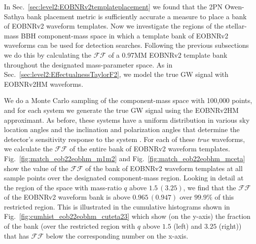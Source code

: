 \documentclass[aps,
prd,
amsmath,
amssymb,
twocolumn,
floatfix,
groupedaddress]{revtex4-1}
\newcommand{\FF}{\mathcal{FF}}
\newcommand{\MM}{\mathrm{MM}}
\begin{document}
In Sec.~\ref{sec:level2:EOBNRv2templateplacement} we found that the 2PN Owen-Sathya bank placement metric is sufficiently accurate a measure to place a bank of EOBNRv2 waveform templates. Now we investigate the regions of the stellar-mass BBH component-mass space in which a template bank of EOBNRv2 waveforms can be used for detection searches. Following the previous subsections we do this by calculating the $\mathcal{FF}$ of a 0.97$\MM$ EOBNRv2 template bank throughout the designated mass-parameter space. As in Sec.~\ref{sec:level2:EffectualnessTaylorF2}, we model the true GW signal with EOBNRv2HM waveforms. 

We do a Monte Carlo sampling of the component-mass space with 100,000 points, and for each system we generate the true GW signal using the EOBNRv2HM approximant. As before, these systems have a uniform distribution in various sky location angles and the inclination and polarization angles that determine the detector's sensitivity response to the system \citep{Sathyaprakash:2009xs}. For each of these \textit{true} waveforms, we calculate the $\FF$ of the entire bank of EOBNRv2 waveform templates. Fig.~\ref{fig:match_eob22eobhm_m1m2} and Fig.~\ref{fig:match_eob22eobhm_mceta} show the value of the $\FF$ of the bank of EOBNRv2 waveform templates at all sample points over the designated component-mass region. Looking in detail at the region of the space with mass-ratio $q$ above $1.5\, (3.25)$, we find that the $\FF$ of the EOBNRv2 waveform bank is above $0.965\, (0.947)$ over $99.9\%$ of this restricted region. This is illustrated in the cumulative histograms shown in Fig.~\ref{fig:cumhist_eob22eobhm_cuteta23} 
which show (on the y-axis) the fraction of the bank (over the restricted region with $q$ above $1.5$ (left) and $3.25$ (right)) that has $\FF$ below the corresponding number on the x-axis. 
\end{document}
